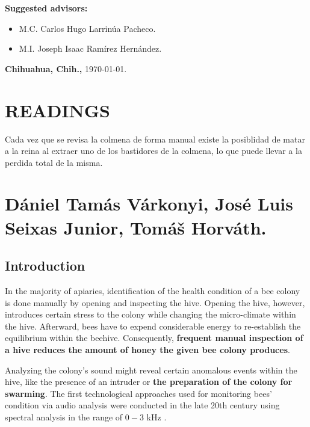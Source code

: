 \documentclass[12pt]{report}
\begin{document}
\begin{titlepage}
\begin{center}
			{\large \textbf{Suggested advisors:}}\\[3.5ex]
			\begin{itemize}
				\item {\large M.C. Carlos Hugo Larrinúa Pacheco.}\\[3.5ex]
				\item {\large M.I. Joseph Isaac Ramírez Hernández.}\\[3.5ex]
			\end{itemize}
			\vfill
			{\large \textbf{Chihuahua, Chih.,} \today.}\\[3.5ex]
		\end{center}
	\end{titlepage}
	
	
	
	\chapter{READINGS}
	
	Cada vez que se revisa la colmena de forma manual existe la posiblidad de matar a la reina al extraer uno de los bastidores de la colmena, lo que puede llevar a la perdida total de la misma.
	
	\chapter{Dániel Tamás Várkonyi, José Luis Seixas Junior, Tomáš Horváth.}
	
	\section{Introduction}
	
	In the majority of apiaries, identification of the health condition of a bee colony is done manually by opening and inspecting the hive. Opening the hive, however, introduces certain stress to the colony while changing the micro-climate within the hive. Afterward, bees have to expend considerable energy to re-establish the equilibrium within the beehive. Consequently, \textbf{frequent manual inspection of a hive reduces the amount of honey the given bee colony produces}.
	
	\par Analyzing the colony's sound might reveal certain anomalous events within the hive, like the presence of an intruder or \textbf{the preparation of the colony for swarming}. The first technological approaches used for monitoring bees' condition via audio analysis were conducted in the late 20th century using spectral analysis in the range of $0-3$ kHz \cite{dietlein1985spectral_analysis}.
	
\end{document}
